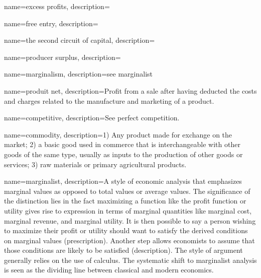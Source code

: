 

{
name=excess profits,
description={}
}

{
name=free entry,
description={}
}

{
name=the second circuit of capital,
description={}
}

{
name=producer surplus,
description={}
}

{
name=marginalism,
description={see \gls{marginalist}}
}

{
name=produit net,
description={Profit from a sale after having deducted the costs and charges related to the manufacture and marketing of a product.}
}

{
name=competitive,
description={See \gls{perfect competition}.}
}

{
name=commodity,
description={1) Any product  made for exchange on the market; 2) a basic good used in commerce that is interchangeable with other goods of the same type, usually  as inputs to the production of other goods or services; 3) raw materials or primary agricultural products.}
}

{
name=marginalist,
description={A style of economic analysis that emphasizes marginal values as opposed to total values or average values. The significance of the distinction lies in the fact maximizing a function like the profit function or utility gives rise to expression in terms of marginal quantities like marginal cost, marginal revenue, and marginal utility. It is then possible to say a person wishing to maximize their profit or utility should want to satisfy the derived conditions on marginal values (prescription). Another step allows economists to assume that those conditions are likely to be satisfied (description). The style of argument generally relies on the use of calculus. The systematic shift to marginalist analysis is seen as the dividing line between classical and modern economics.}
}

